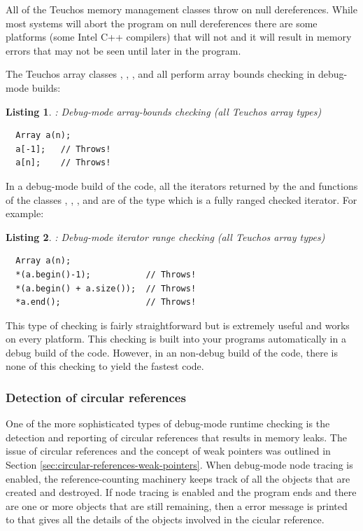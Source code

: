 \documentclass[pdf,ps2pdf,11pt]{SANDreport}
\newtheorem{listing}{Listing}
\begin{document}
All of the Teuchos memory management classes throw on null
dereferences.  While most systems will abort the program on null
dereferences there are some platforms (some Intel C++ compilers) that
will not and it will result in memory errors that may not be seen
until later in the program.

The Teuchos array classes {}, {},
{}, and {} all perform array bounds
checking in debug-mode builds:

\begin{listing}: Debug-mode array-bounds checking (all Teuchos array types) \\
\label{listing:array-bounds-checking}
{\small\begin{verbatim}
  Array a(n);
  a[-1];   // Throws!
  a[n];    // Throws!
\end{verbatim}}
\end{listing}

In a debug-mode build of the code, all the iterators returned by the
{} and {} functions of the classes
{}, {}, {}, and
{} are of the type {} which is a fully
ranged checked iterator.  For example:

\begin{listing}: Debug-mode iterator range checking (all Teuchos array types) \\
\label{listing:iterator-checking}
{\small\begin{verbatim}
  Array a(n);
  *(a.begin()-1);           // Throws!
  *(a.begin() + a.size());  // Throws!
  *a.end();                 // Throws!
\end{verbatim}}
\end{listing}

This type of checking is fairly straightforward but is extremely
useful and works on every platform.  This checking is built into your
programs automatically in a debug build of the code.  However, in an
non-debug build of the code, there is none of this checking to yield
the fastest code.


%
{}\subsubsection{Detection of circular references}
\label{sec:detection-circular-references}
%

One of the more sophisticated types of debug-mode runtime checking is
the detection and reporting of circular {} references that
results in memory leaks.  The issue of circular references and the
concept of weak pointers was outlined in Section
{}\ref{sec:circular-references-weak-pointers}.  When debug-mode node
tracing is enabled, the reference-counting machinery keeps track of
all the {} objects that are created and destroyed.  If
node tracing is enabled and the program ends and there are one or more
{} objects that are still remaining, then a error
message is printed to {} that gives all the details
of the objects involved in the cicular reference.
\end{document}

